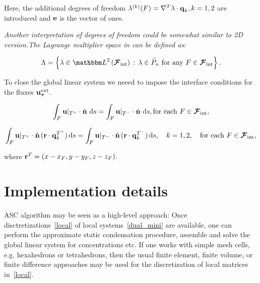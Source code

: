 Here, the additional degrees of freedom $\lambda^{(k)}(F) = \nabla^T \lambda  \cdot  \vect q_k, k=1,2$
are introduced and $\vect e$ is the vector of ones.

{\it Another interpretation of degrees of freedom could be somewhat similar to 2D version.The Lagrange multiplier space in can be defined as}:

$$\Lambda=\left\{\lambda\in \LTwoSpace[{\bfaces[int]}]\,:\, \lambda\in {\widetilde P}_n~\text{for any}~F\in\bfaces[int]\right\}.
$$

To close the global linear system we neeed to impose the interface conditions for the fluxes $\vect u^{\text{ext}}_\mmesh$.

\begin{equation}\label{flux_cont1}
\int_F \vect u|_{\bcell^+}\cdot\hat{\vect n}\, \diff s =
\int_F \vect u|_{\bcell^-}\cdot\hat{\vect n}\, \diff s, \text{for each } F \in \bfaces[int],
\end{equation}


\begin{equation}\label{flux_cont2}
\int_F \vect u|_{\bcell^+}\cdot\hat{\vect n}\,({\vect r} \cdot \vect q_k^{\bcell^+}) \diff s =
\int_F \vect u|_{\bcell^-}\cdot\hat{\vect n}\,({\vect r} \cdot \vect q_k^{\bcell^-}) \diff s,
\quad k=1,2,  \quad \text{for each } F \in \bfaces[int],
\end{equation}

where ${\vect r}^T = (x-x_F, y-y_F, z-z_F).$

\section{Implementation details}

ASC algorithm may be seen as a high-level approach: Once disctretizations~\eqref{local} of local systems~\eqref{dual_mini} are available, one can perform the approximate static condensation procedure, assemble and solve the global linear system for concentrations etc. If one works with simple mesh cells, e.g. hexahedrons or tetrahedrons, then the usual finite element, finite volume, or finite difference approaches may be used for the discretization of local matrices in~\eqref{local}. 


